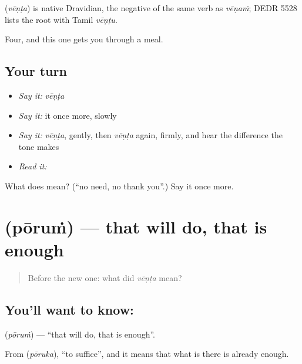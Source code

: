 \begin{cousinweb}
\textbf{} (\emph{vēṇṭa}) is native Dravidian, the negative of the same verb as \emph{vēṇaṁ}; DEDR 5528 lists the root with Tamil \emph{vēṇṭu}.
\end{cousinweb}

\begin{grammarlens}[title={What you've built}]
Four, and this one gets you through a meal.
\end{grammarlens}

\subsection*{Your turn}
\begin{itemize}
\raggedright
  \item \emph{Say it:} \emph{vēṇṭa}
  \item \emph{Say it:} it once more, slowly
  \item \emph{Say it:} \emph{vēṇṭa}, gently, then \emph{vēṇṭa} again, firmly, and hear the difference the tone makes
  \item \emph{Read it:} \textbf{}
\end{itemize}

\begin{tcolorbox}[breakable,colback=teal!4,colframe=teal!35!black,title={Before you move on}]
What does  mean? (\textquotedblleft{}no need, no thank you\textquotedblright{}.) Say it once more.
\end{tcolorbox}
\section[\texorpdfstring{\ml{പോരും} (pōruṁ)}{പോരും (pōruṁ)}]{ (pōruṁ) — that will do, that is enough}

\label{lesson:ML-C58-that-will-do}



\begin{quote}
Before the new one: what did \emph{vēṇṭa} mean?
\end{quote}

\subsection*{You'll want to know: }
\textbf{} (\emph{pōruṁ}) — \textquotedblleft{}that will do, that is enough\textquotedblright{}.

From  (\emph{pōruka}), \textquotedblleft{}to suffice\textquotedblright{}, and it means that what is there is already enough.

